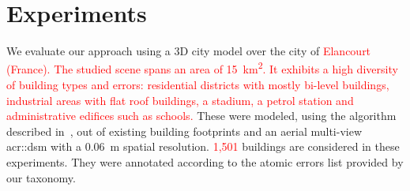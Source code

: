 \documentclass[conference]{IEEEtran}
\begin{document}
\section{Experiments}
\label{sec:expe}

We evaluate our approach using a 3D city model over the city of \textcolor{red}{Elancourt (France). The studied scene spans an area of \SI{15}{\km\squared}. It exhibits a high diversity of building types and errors: residential districts with mostly bi-level buildings, industrial areas with flat roof buildings, a stadium, a petrol station and administrative edifices such as schools.} These were modeled, using the algorithm described in~\cite{Durupt2006}, out of existing building footprints and an aerial multi-view \acrshort{acr::dsm} with a \SI{0.06}{\m} spatial resolution. \textcolor{red}{1,501} buildings are considered in these experiments. They were annotated according to the atomic errors list provided by our taxonomy.
\end{document}
